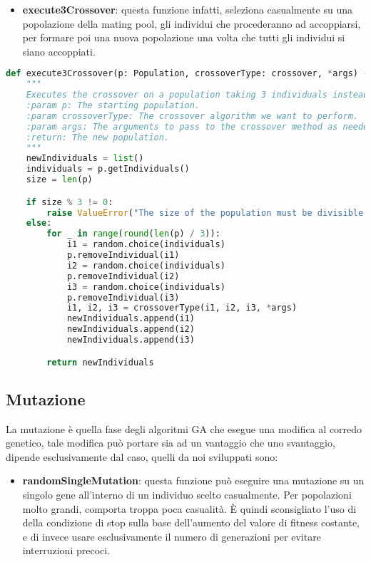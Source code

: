 \documentclass{article}
\begin{document}
\begin{itemize}
\item\textbf{execute3Crossover}: questa funzione infatti, seleziona casualmente su una popolazione della mating pool, gli individui che procederanno ad accoppiarsi, per formare poi una nuova popolazione una volta che tutti gli individui si siano accoppiati.
\end{itemize}

\begin{lstlisting}[language=Python]
def execute3Crossover(p: Population, crossoverType: crossover, *args) -> list[Individual]:
    """
    Executes the crossover on a population taking 3 individuals instead of 2.
    :param p: The starting population.
    :param crossoverType: The crossover algorithm we want to perform.
    :param args: The arguments to pass to the crossover method as needed.
    :return: The new population.
    """
    newIndividuals = list()
    individuals = p.getIndividuals()
    size = len(p)

    if size % 3 != 0:
        raise ValueError("The size of the population must be divisible by 3!")
    else:
        for _ in range(round(len(p) / 3)):
            i1 = random.choice(individuals)
            p.removeIndividual(i1)
            i2 = random.choice(individuals)
            p.removeIndividual(i2)
            i3 = random.choice(individuals)
            p.removeIndividual(i3)
            i1, i2, i3 = crossoverType(i1, i2, i3, *args)
            newIndividuals.append(i1)
            newIndividuals.append(i2)
            newIndividuals.append(i3)

        return newIndividuals
\end{lstlisting}



\pagebreak

\subsection{Mutazione}

La mutazione è quella fase degli algoritmi GA che esegue una modifica al corredo genetico, tale modifica può portare sia ad un vantaggio che uno svantaggio, dipende esclusivamente dal caso, quelli da noi sviluppati sono:

\begin{itemize}
\item\textbf{randomSingleMutation}: questa funzione può eseguire una mutazione su un singolo gene all'interno di un individuo scelto casualmente. 
Per popolazioni molto grandi, comporta troppa poca casualità. È quindi sconsigliato l'uso di della condizione di stop sulla base dell'aumento del valore di fitness costante, e di invece usare esclusivamente il numero di generazioni per evitare interruzioni precoci.
\end{itemize}
\end{document}
